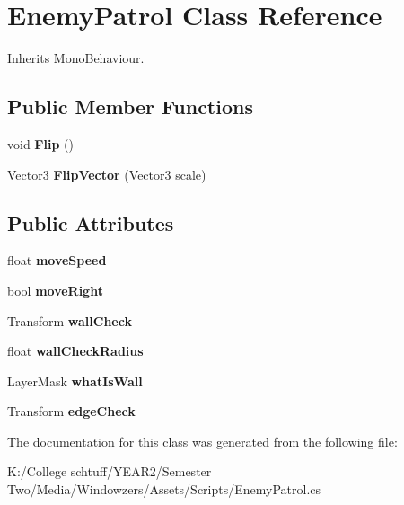\hypertarget{class_enemy_patrol}{}\section{Enemy\+Patrol Class Reference}
\label{class_enemy_patrol}


Inherits Mono\+Behaviour.

\subsection*{Public Member Functions}
\begin{DoxyCompactItemize}
\item 
\mbox{\label{class_enemy_patrol_ab715d30e1416461d3a4bc567e72fe163}} 
void {\bfseries Flip} ()
\item 
\mbox{\label{class_enemy_patrol_a9ff0c42a71664a797ccbd5f6a45465ec}} 
Vector3 {\bfseries Flip\+Vector} (Vector3 scale)
\end{DoxyCompactItemize}
\subsection*{Public Attributes}
\begin{DoxyCompactItemize}
\item 
\mbox{\label{class_enemy_patrol_a530275206bd103ce54afcc1b18737285}} 
float {\bfseries move\+Speed}
\item 
\mbox{\label{class_enemy_patrol_a972b7456ad22a4c28bcf5b65d0bf98a4}} 
bool {\bfseries move\+Right}
\item 
\mbox{\label{class_enemy_patrol_a7238da9c93d2f86e4f06d4f80e349605}} 
Transform {\bfseries wall\+Check}
\item 
\mbox{\label{class_enemy_patrol_a1aa404360217100063db327f27e84bd0}} 
float {\bfseries wall\+Check\+Radius}
\item 
\mbox{\label{class_enemy_patrol_a7df59b4b6bc41d0473c9aa7bc1a89a07}} 
Layer\+Mask {\bfseries what\+Is\+Wall}
\item 
\mbox{\label{class_enemy_patrol_ada109d9acc3623d9aeb743939713f321}} 
Transform {\bfseries edge\+Check}
\end{DoxyCompactItemize}


The documentation for this class was generated from the following file\+:\begin{DoxyCompactItemize}
\item 
K\+:/\+College schtuff/\+Y\+E\+A\+R2/\+Semester Two/\+Media/\+Windowzers/\+Assets/\+Scripts/Enemy\+Patrol.\+cs\end{DoxyCompactItemize}
